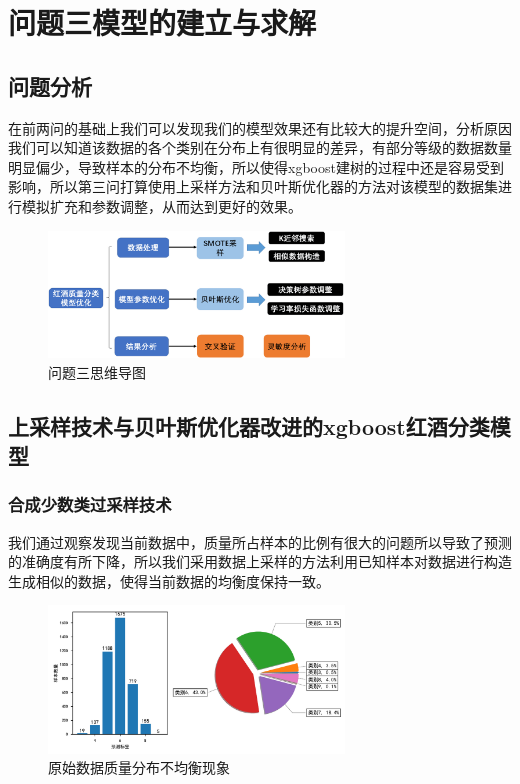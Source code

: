 \documentclass{whutmod}
\begin{document}
\section{问题三模型的建立与求解}
\subsection{问题分析}
在前两问的基础上我们可以发现我们的模型效果还有比较大的提升空间，分析原因我们可以知道该数据的各个类别在分布上有很明显的差异，有部分等级的数据数量明显偏少，导致样本的分布不均衡，所以使得xgboost建树的过程中还是容易受到影响，所以第三问打算使用上采样方法和贝叶斯优化器的方法对该模型的数据集进行模拟扩充和参数调整，从而达到更好的效果。
\begin{figure}[!h]
	\centering
	\includegraphics[width=0.7\textwidth]{map3.png}
	\caption{问题三思维导图}
\end{figure}
\subsection{上采样技术与贝叶斯优化器改进的xgboost红酒分类模型}
\subsubsection{合成少数类过采样技术}
我们通过观察发现当前数据中，质量所占样本的比例有很大的问题所以导致了预测的准确度有所下降，所以我们采用数据上采样的方法利用已知样本对数据进行构造生成相似的数据，使得当前数据的均衡度保持一致。
\begin{figure}[!h]
	\centering
	\includegraphics[width=0.7\textwidth]{labels_class_counts_data.pdf}
	\caption{原始数据质量分布不均衡现象}
\end{figure}
\end{document}
